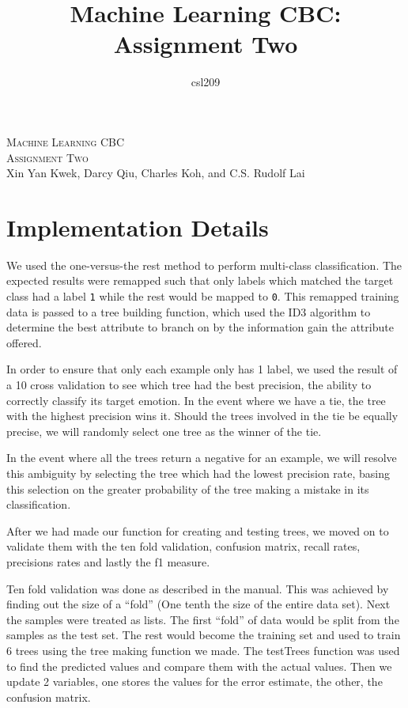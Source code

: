 \documentclass[a4paper,10pt]{article}
\title{Machine Learning CBC: Assignment Two}
\author{csl209}
\date{}
\begin{document}
\LARGE\noindent
\textsc{Machine Learning CBC \\ Assignment Two} \\[1cm]

\large\noindent
Xin Yan Kwek, Darcy Qiu, Charles Koh, and C.S. Rudolf Lai\\ 

\normalsize

\section*{Implementation Details}

We used the one-versus-the rest method to perform multi-class classification. The expected results were remapped such that only labels which matched the target class had a label \texttt{1} while the rest would be mapped to \texttt{0}. This remapped training data is passed to a tree building function, which used the ID3 algorithm to determine the best attribute to branch on by the information gain the attribute offered.

In order to ensure that only each example only has 1 label, we used the result of a 10 cross validation to see which tree had the best precision, the ability to correctly classify its target emotion. In the event where we have a tie, the tree with the highest precision wins it. Should the trees involved in the tie be equally precise, we will randomly select one tree as the winner of the tie.

In the event where all the trees return a negative for an example, we will resolve this ambiguity by selecting the tree which had the lowest precision rate, basing this selection on the greater probability of the tree making a mistake in its classification.

After we had made our function for creating and testing trees, we moved on to validate them with the ten fold validation, confusion matrix, recall rates, precisions rates and lastly the f1 measure.

Ten fold validation was done as described in the manual. This was achieved by finding out the size of a “fold” (One tenth the size of the entire data set). Next the samples were treated as lists. The first “fold” of data would be split from the samples as the test set. The rest would become the training set and used to train 6 trees using the tree making function we made. The testTrees function was used to find the predicted values and compare them with the actual values. Then we update 2 variables, one stores the values for the error estimate, the other, the confusion matrix.
\end{document}

